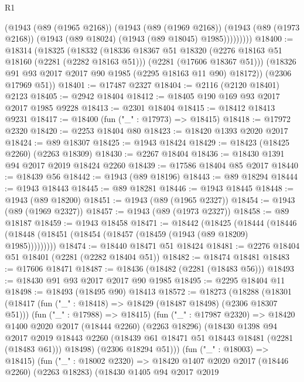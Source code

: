 \begin{lexlean}{R1}
\begin{coremodule}
            (@1943
              (@89 (@1965 @2168))
              (@1943
                (@89 (@1969 @2168))
                (@1943 (@89 (@1973 @2168)) (@1943 (@89 @18024) (@1943 (@89 @18045) @1985)))))))))
@18400 := @18314
    (@18325
      (@18332
        (@18336
          @18367
          @51
          @18320
          (@2276 @18163 @51 @18160 (@2281 (@2282 @18163 @51)))
          (@2281 (@17606 @18367 @51)))
        (@18326 @91 @93 @2017 @2017 @90 @1985 (@2295 @18163 @11 @90) @18172))
      (@2306 @17969 @51))
@18401 := @17487 @2327
@18404 := @2116 (@2120 @18401) @2123
@18405 := @2942 @18404
@18412 := @18405 @190 @169 @93 @2017 @2017 @1985 @9228
@18413 := @2301 @18404
@18415 := @18412 @18413 @9231
@18417 := @18400 (fun ("_" : @17973) => @18415)
@18418 := @17972 @2320
@18420 := @2253 @18404 @80
@18423 := @18420 @1393 @2020 @2017
@18424 := @89 @18307
@18425 := @1943 @18424
@18429 := @18423 (@18425 @2260) (@2263 @18309)
@18430 := @2267 @18404
@18436 := @18430 @1391 @94 @2017 @2019 @18424 @2260
@18439 := @17586 @18404 @85 @2017
@18440 := @18439 @56
@18442 := @1943 (@89 @18196)
@18443 := @89 @18294
@18444 := @1943 @18443
@18445 := @89 @18281
@18446 := @1943 @18445
@18448 := @1943 (@89 @18200)
@18451 := @1943 (@89 (@1965 @2327))
@18454 := @1943 (@89 (@1969 @2327))
@18457 := @1943 (@89 (@1973 @2327))
@18458 := @89 @18187
@18459 := @1943 @18458
@18471 := @18442
    (@18425
      (@18444 (@18446 (@18448 (@18451 (@18454 (@18457 (@18459 (@1943 (@89 @18209) @1985)))))))))
@18474 := @18440 @18471 @51 @18424
@18481 := @2276 @18404 @51 @18401 (@2281 (@2282 @18404 @51))
@18482 := @18474 @18481
@18483 := @17606 @18471
@18487 := @18436 (@18482 (@2281 (@18483 @56)))
@18493 := @18430 @91 @93 @2017 @2017 @90 @1985
@18495 := @2295 @18404 @11
@18498 := @18493 (@18495 @90) @18413
@18572 := @18273
    (@18288
      (@18301
        (@18417 (fun ("_" : @18418) => @18429 (@18487 @18498) (@2306 @18307 @51)))
        (fun ("_" : @17988) => @18415)
        (fun ("_" : @17987 @2320) =>
        @18420
          @1400
          @2020
          @2017
          (@18444 @2260)
          (@2263 @18296)
          (@18430
            @1398
            @94
            @2017
            @2019
            @18443
            @2260
            (@18439 @61 @18471 @51 @18443 @18481 (@2281 (@18483 @61)))
            @18498)
          (@2306 @18294 @51)))
      (fun ("_" : @18003) => @18415)
      (fun ("_" : @18002 @2320) =>
      @18420
        @1407
        @2020
        @2017
        (@18446 @2260)
        (@2263 @18283)
        (@18430
          @1405
          @94
          @2017
          @2019

\end{coremodule}
\end{lexlean}
